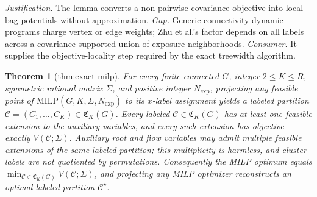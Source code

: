 \documentclass{article}
\newtheorem{theorem}{Theorem}
\begin{document}
\par\smallskip\noindent \textit{Justification.} The lemma converts a non-pairwise covariance objective into local bag potentials without approximation. \textit{Gap.} Generic connectivity dynamic programs charge vertex or edge weights; Zhu et al.'s factor depends on all labels across a covariance-supported union of exposure neighborhoods. \textit{Consumer.} It supplies the objective-locality step required by the exact treewidth algorithm.

\begin{theorem}[thm:exact-milp]\label{thm:exact-milp}
For every finite connected \(G\), integer \(2\le K\le R\), symmetric rational matrix \(\Sigma\), and positive integer \(N_{\exp}\), projecting any feasible point of \(\mathrm{MILP}(G,K,\Sigma,N_{\exp})\) to its \(x\)-label assignment yields a labeled partition \(\mathcal C=(C_1,\ldots,C_K)\in\mathfrak C_K(G)\). Every labeled \(\mathcal C\in\mathfrak C_K(G)\) has at least one feasible extension to the auxiliary variables, and every such extension has objective exactly \(V(\mathcal C;\Sigma)\). Auxiliary root and flow variables may admit multiple feasible extensions of the same labeled partition; this multiplicity is harmless, and cluster labels are not quotiented by permutations. Consequently the MILP optimum equals \(\min_{\mathcal C\in\mathfrak C_K(G)}V(\mathcal C;\Sigma)\), and projecting any MILP optimizer reconstructs an optimal labeled partition \(\mathcal C^\star\).
\end{theorem}
\end{document}
